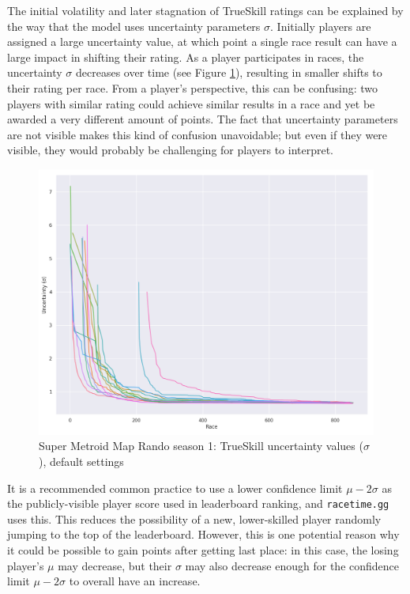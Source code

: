 \documentclass{article}
\begin{document}
	The initial volatility and later stagnation of TrueSkill ratings can be explained by the way that the model uses uncertainty parameters $\sigma$. Initially players are assigned a large uncertainty value, at which point a single race result can have a large impact in shifting their rating. As a player participates in races, the uncertainty $\sigma$ decreases over time (see Figure \ref{fig:s1_trueskill_sigma}), resulting in smaller shifts to their rating per race. From a player's perspective, this can be confusing: two players with similar rating could achieve similar results in a race and yet be awarded a very different amount of points. The fact that uncertainty parameters are not visible makes this kind of confusion unavoidable; but even if they were visible, they would probably be challenging for players to interpret.
	\begin{figure}
	\centering
	\includegraphics[width=0.75\linewidth]{figures/s1_trueskill_sigma.png}
	\caption{Super Metroid Map Rando season 1: TrueSkill uncertainty values ($\sigma$), default settings}
	\label{fig:s1_trueskill_sigma}
	\end{figure}
	
	It is a recommended common practice to use a lower confidence limit $\mu - 2\sigma$ as the publicly-visible player score used in leaderboard ranking, and \texttt{racetime.gg} uses this. This reduces the possibility of a new, lower-skilled player randomly jumping to the top of the leaderboard. However, this is one potential reason why it could be possible to gain points after getting last place: in this case, the losing player's $\mu$ may decrease, but their $\sigma$ may also decrease enough for the confidence limit $\mu - 2\sigma$ to overall have an increase.
	
\end{document}
